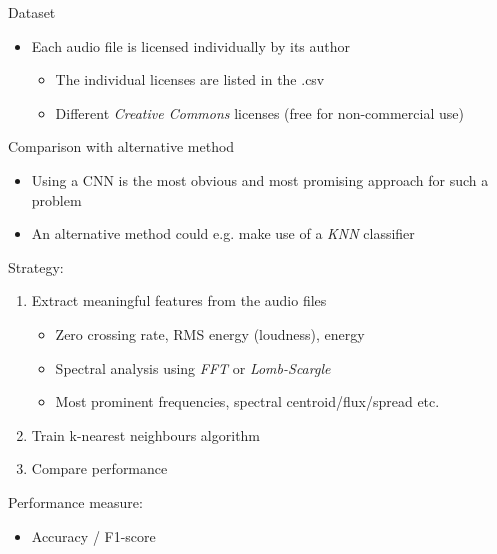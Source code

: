 \begin{frame}{Dataset}
{\begin{itemize}
      \begin{itemize}
        \item A website for sharing and classifying wildlife sound recordings
      \end{itemize}
      \item Each audio file is licensed individually by its author
      \begin{itemize}
        \item The individual licenses are listed in the .csv 
        \item Different \textit{Creative Commons} licenses (free for non-commercial use)
      \end{itemize}
    \end{itemize}
  }
\end{frame}

\begin{frame}{Comparison with alternative method}
  \begin{itemize}
    \item Using a CNN is the most obvious and most promising approach for such a problem 
    \item An alternative method could e.g. make use of a \textit{KNN} classifier
  \end{itemize}
  \vspace{2mm}
  \textcolor{tugreen}{\large Strategy:}
  \begin{enumerate}
    \item Extract meaningful features from the audio files 
    \begin{itemize}
      \item Zero crossing rate, RMS energy (loudness), energy
      \item Spectral analysis using \textit{FFT} or \textit{Lomb-Scargle}
      \item Most prominent frequencies, spectral centroid/flux/spread etc.
    \end{itemize}
    \item Train k-nearest neighbours algorithm 
    \item Compare performance
  \end{enumerate}
  \vspace{2mm}
  \textcolor{tugreen}{\large Performance measure:}
  \begin{itemize}
    \item Accuracy / F1-score
  \end{itemize}
\end{frame}
